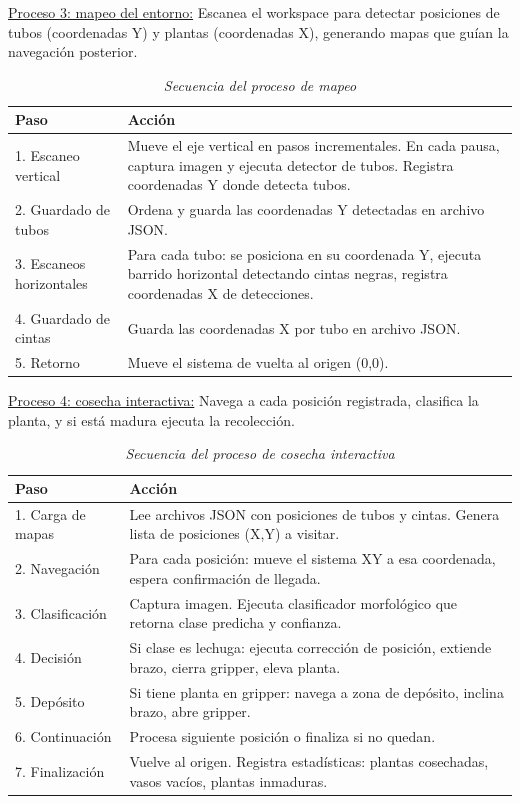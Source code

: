 \underline{Proceso 3: mapeo del entorno:} Escanea el workspace para detectar posiciones de tubos (coordenadas Y) y plantas (coordenadas X), generando mapas que guían la navegación posterior.

\begin{table}[H]
\centering
\small
\begin{tabular}{|l|p{10cm}|}
\hline
Paso & Acción \\
\hline
1. Escaneo vertical & Mueve el eje vertical en pasos incrementales. En cada pausa, captura imagen y ejecuta detector de tubos. Registra coordenadas Y donde detecta tubos. \\
\hline
2. Guardado de tubos & Ordena y guarda las coordenadas Y detectadas en archivo JSON. \\
\hline
3. Escaneos horizontales & Para cada tubo: se posiciona en su coordenada Y, ejecuta barrido horizontal detectando cintas negras, registra coordenadas X de detecciones. \\
\hline
4. Guardado de cintas & Guarda las coordenadas X por tubo en archivo JSON. \\
\hline
5. Retorno & Mueve el sistema de vuelta al origen (0,0). \\
\hline
\end{tabular}
\caption{\textit{Secuencia del proceso de mapeo}}
\label{tab:proceso_mapeo}
\end{table}

\underline{Proceso 4: cosecha interactiva:} Navega a cada posición registrada, clasifica la planta, y si está madura ejecuta la recolección.

\begin{table}[H]
\centering
\small
\begin{tabular}{|l|p{10cm}|}
\hline
Paso & Acción \\
\hline
1. Carga de mapas & Lee archivos JSON con posiciones de tubos y cintas. Genera lista de posiciones (X,Y) a visitar. \\
\hline
2. Navegación & Para cada posición: mueve el sistema XY a esa coordenada, espera confirmación de llegada. \\
\hline
3. Clasificación & Captura imagen. Ejecuta clasificador morfológico que retorna clase predicha y confianza. \\
\hline
4. Decisión & Si clase es lechuga: ejecuta corrección de posición, extiende brazo, cierra gripper, eleva planta. \\
\hline
5. Depósito & Si tiene planta en gripper: navega a zona de depósito, inclina brazo, abre gripper. \\
\hline
6. Continuación & Procesa siguiente posición o finaliza si no quedan. \\
\hline
7. Finalización & Vuelve al origen. Registra estadísticas: plantas cosechadas, vasos vacíos, plantas inmaduras. \\
\hline
\end{tabular}
\caption{\textit{Secuencia del proceso de cosecha interactiva}}
\label{tab:proceso_cosecha}
\end{table}

